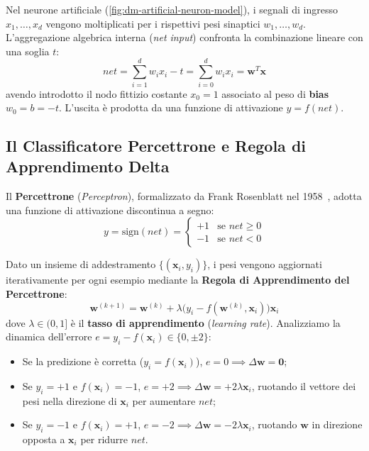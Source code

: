 Nel neurone artificiale (\autoref{fig:dm-artificial-neuron-model}), i segnali di ingresso $x_1, \dots, x_d$ vengono moltiplicati per i rispettivi pesi sinaptici $w_1, \dots, w_d$. L'aggregazione algebrica interna (\textit{net input}) confronta la combinazione lineare con una soglia $t$:
\begin{equation}
    net = \sum_{i=1}^d w_i x_i - t = \sum_{i=0}^d w_i x_i = \mathbf{w}^T \mathbf{x}
\end{equation}
avendo introdotto il nodo fittizio costante $x_0 = 1$ associato al peso di \textbf{bias} $w_0 = b = -t$. L'uscita è prodotta da una funzione di attivazione $y = f(net)$.

\FloatBarrier
\subsection{Il Classificatore Percettrone e Regola di Apprendimento Delta}
\label{subsec:dm-perceptron-delta-rule}

Il \textbf{Percettrone} (\textit{Perceptron}), formalizzato da Frank Rosenblatt nel 1958~\cite{rosenblatt1958}, adotta una funzione di attivazione discontinua a segno:
\begin{equation}
    y = \text{sign}(net) = \begin{cases} +1 & \text{se } net \ge 0 \\ -1 & \text{se } net < 0 \end{cases}
\end{equation}

Dato un insieme di addestramento $\{(\mathbf{x}_i, y_i)\}$, i pesi vengono aggiornati iterativamente per ogni esempio mediante la \textbf{Regola di Apprendimento del Percettrone}:
\begin{equation}
    \mathbf{w}^{(k+1)} = \mathbf{w}^{(k)} + \lambda \big(y_i - f(\mathbf{w}^{(k)}, \mathbf{x}_i)\big) \mathbf{x}_i
    \label{eq:dm-perceptron-update-rule}
\end{equation}
dove $\lambda \in (0, 1]$ è il \textbf{tasso di apprendimento} (\textit{learning rate}).
Analizziamo la dinamica dell'errore $e = y_i - f(\mathbf{x}_i) \in \{0, \pm 2\}$:
\begin{itemize}
    \item Se la predizione è corretta ($y_i = f(\mathbf{x}_i)$), $e = 0 \implies \Delta \mathbf{w} = \mathbf{0}$;
    \item Se $y_i = +1$ e $f(\mathbf{x}_i) = -1$, $e = +2 \implies \Delta \mathbf{w} = +2\lambda \mathbf{x}_i$, ruotando il vettore dei pesi nella direzione di $\mathbf{x}_i$ per aumentare $net$;
    \item Se $y_i = -1$ e $f(\mathbf{x}_i) = +1$, $e = -2 \implies \Delta \mathbf{w} = -2\lambda \mathbf{x}_i$, ruotando $\mathbf{w}$ in direzione opposta a $\mathbf{x}_i$ per ridurre $net$.
\end{itemize}

